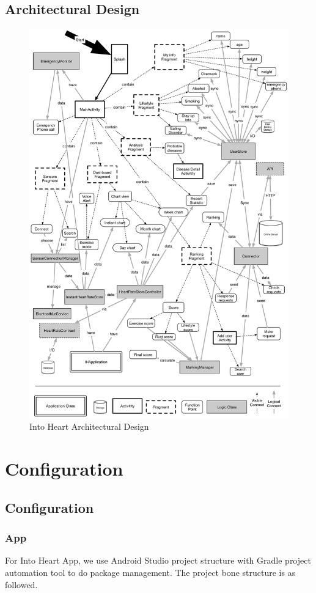\documentclass[10pt,a4paper,final]{scrartcl}
\begin{document}
\subsection{Architectural Design}
\begin{figure}[H]
\centering
\includegraphics[width=5.3in]{img/arch.eps}
\caption{Into Heart Architectural Design}
\end{figure}

\section{Configuration}
\subsection{Configuration}
\subsubsection{App}
For Into Heart App, we use Android Studio project structure with Gradle project automation tool to do package management. The project bone structure is as followed.
\end{document}
